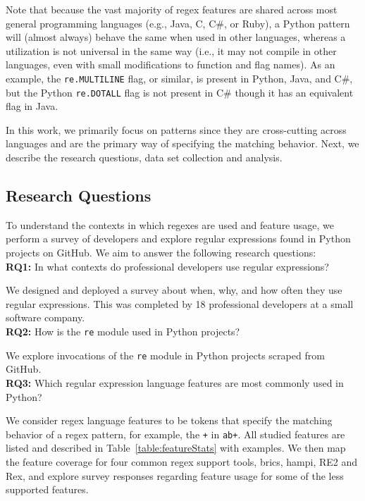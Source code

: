 Note that because the vast majority of regex features are shared across most general programming languages (e.g., Java, C, C\#, or Ruby), a Python {pattern} will (almost always) behave the same when used in other languages, whereas a utilization is not universal in the same way (i.e., it may not compile in other languages, even with small modifications to function and flag names).
As an example, the {\tt re.MULTILINE} flag, or similar, is present in Python, Java, and C\#, but  the Python {\tt re.DOTALL} flag is not present in C\# though it has an equivalent flag in Java.

In this work, we primarily focus on patterns since they are cross-cutting across languages and are the primary way of specifying the matching behavior. Next, we describe the research questions, data set collection and analysis.

\subsection{Research Questions}
\label{sec:rqs}
To understand the contexts in which regexes are used  and feature usage, we perform a survey of developers and explore regular expressions found in Python projects on GitHub. We aim to answer the following research questions:\\

\noindent \textbf{RQ1:} In what contexts do professional developers use regular expressions?

We designed and deployed a survey about when, why, and how often they use regular expressions. This was completed by 18 professional developers at a small software company.\\

\noindent \textbf{RQ2:} How  is the {\tt re} module used in Python projects?

We explore invocations of  the {\tt re} module in  Python projects scraped from GitHub.\\


\noindent \textbf{RQ3:} Which regular expression language features are most commonly used in Python?

We consider regex language features to be tokens that specify the matching behavior of a regex pattern, for example,  the {\tt +} in {\tt ab+}.  All studied features are listed and described in Table~\ref{table:featureStats} with examples. We then map the feature coverage for four common regex support tools, brics, hampi, RE2 and Rex, and explore survey responses regarding feature usage for some of the less supported features.\\

